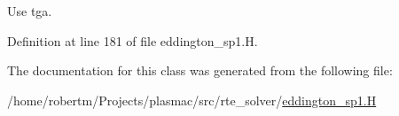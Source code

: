 Use tga. 



Definition at line 181 of file eddington\+\_\+sp1.\+H.



The documentation for this class was generated from the following file\+:\begin{DoxyCompactItemize}
\item 
/home/robertm/\+Projects/plasmac/src/rte\+\_\+solver/\hyperlink{eddington__sp1_8H}{eddington\+\_\+sp1.\+H}\end{DoxyCompactItemize}
